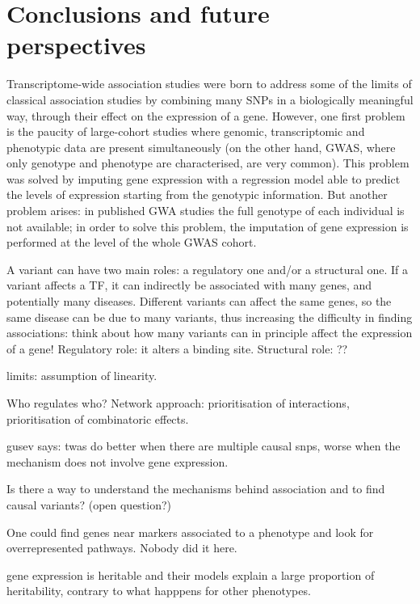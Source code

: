 \documentclass[../main.tex]{subfiles}
\begin{document}
\chapter{Conclusions and future perspectives}

Transcriptome-wide association studies were born to address some of the 
limits of classical association studies by combining many SNPs in a 
biologically meaningful way, \ie through their effect on the expression 
of a gene. However, one first problem is the paucity of large-cohort 
studies where genomic, transcriptomic and phenotypic data are present 
simultaneously (on the other hand, GWAS, where only genotype and 
phenotype are characterised, are very common). This problem was solved 
by imputing gene expression with a regression model able to predict the 
levels of expression starting from the genotypic information. But 
another problem arises: in published GWA studies the full genotype of 
each individual is not available; in order to solve this problem, the 
imputation of gene expression is performed at the level of the whole 
GWAS cohort.

A variant can have two main roles: a regulatory one and/or a structural 
one. If a variant affects a TF, it can indirectly be associated with 
many genes, and potentially many diseases. Different variants can affect 
the same genes, so the same disease can be due to many variants, thus 
increasing the difficulty in finding associations: think about how many 
variants can in principle affect the expression of a gene! Regulatory 
role: it alters a binding site. Structural role: ??

limits: assumption of linearity.

Who regulates who? Network approach: prioritisation of interactions, 
prioritisation of combinatoric effects.

gusev says: twas do better when there are multiple causal snps, worse 
when the mechanism does not involve gene expression.

Is there a way to understand the mechanisms behind association and to 
find causal variants? (open question?)

One could find genes near markers associated to a phenotype and look for 
overrepresented pathways. Nobody did it here.

gene expression is heritable and their models explain a large proportion 
of heritability, contrary to what happpens for other phenotypes.
\end{document}
